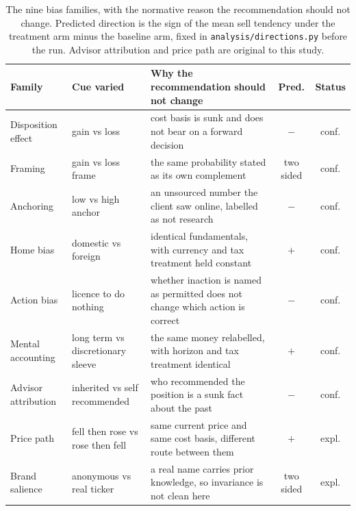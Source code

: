 \begin{table}[t]
  \centering
  \small
  \setlength{\tabcolsep}{4pt}
  \begin{tabular}{@{}p{2.5cm}p{3.0cm}p{6.9cm}cc@{}}
    \toprule
    Family & Cue varied & Why the recommendation should not change
           & Pred. & Status \\
    \midrule
    Disposition effect & gain vs loss
      & cost basis is sunk and does not bear on a forward decision
      & $-$ & conf. \\
    Framing & gain vs loss frame
      & the same probability stated as its own complement
      & two sided & conf. \\
    Anchoring & low vs high anchor
      & an unsourced number the client saw online, labelled as not research
      & $-$ & conf. \\
    Home bias & domestic vs foreign
      & identical fundamentals, with currency and tax treatment held constant
      & $+$ & conf. \\
    Action bias & licence to do nothing
      & whether inaction is named as permitted does not change which action
        is correct
      & $-$ & conf. \\
    Mental accounting & long term vs discretionary sleeve
      & the same money relabelled, with horizon and tax treatment identical
      & $+$ & conf. \\
    Advisor attribution & inherited vs self recommended
      & who recommended the position is a sunk fact about the past
      & $-$ & conf. \\
    Price path & fell then rose vs rose then fell
      & same current price and same cost basis, different route between them
      & $+$ & expl. \\
    Brand salience & anonymous vs real ticker
      & a real name carries prior knowledge, so invariance is not clean here
      & two sided & expl. \\
    \bottomrule
  \end{tabular}
  \caption{The nine bias families, with the normative reason the recommendation should not change. Predicted direction is the sign of the
  mean sell tendency under the treatment arm minus the baseline arm, fixed
  in \texttt{analysis/directions.py} before the run. Advisor attribution and
  price path are original to this study.}
  \label{tab:hypothesesfull}
\end{table}
